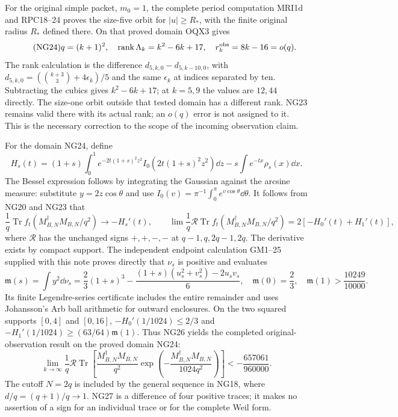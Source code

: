 \documentclass[11pt]{article}
\newcommand{\Tr}{\operatorname{Tr}}\newcommand{\rank}{\operatorname{rank}}
\begin{document}
For the original simple packet, $m_0=1$, the complete period computation
MRI1d and RPC18--24 proves the size-five orbit for $|u|\ge R_*$,
with the finite original radius $R_*$ defined there. On that proved
domain OQX3 gives
\begin{equation}\tag{NG24}
 q=(k+1)^2,\quad \rank\Lambda_k=k^2-6k+17,
 \quad r_k^{\rm obs}=8k-16=o(q).
\end{equation}
The rank calculation is the difference
$d_{5,k,0}-d_{5,k-10,0}$, with
$d_{5,k,0}=(\binom{k+3}{3}+4\epsilon_k)/5$ and the same
$\epsilon_k$ at indices separated by ten. Subtracting the cubics
gives $k^2-6k+17$; at $k=5,9$ the values are $12,44$ directly.
The size-one orbit outside that tested domain has a different rank.
NG23 remains valid there with its actual rank; an $o(q)$ error is not
assigned to it. This is the necessary correction to the scope of the
incoming observation claim.

For the domain NG24, define
\begin{equation}\tag{NG25}
 H_s(t)=(1+s)\int_0^1 e^{-2t(1+s)^2z^2}
                    I_0(2t(1+s)^2z^2)\dd z
                      -s\int e^{-tx}\rho_s(x)\dd x.
\end{equation}
The Bessel expression follows by integrating the Gaussian against the
arcsine measure: substitute $y=2z\cos\theta$ and use
$I_0(v)=\pi^{-1}\int_0^\pi e^{v\cos\theta}\dd\theta$.
It follows from NG20 and NG23 that
\begin{equation}\tag{NG26}
 \frac1q\Tr f_t(M_{B,N}^{\dagger}M_{B,N}/q^2)\longrightarrow-H_s'(t),
 \qquad
 \lim\frac1q\mathcal R\Tr f_t(M_{B,N}^{\dagger}M_{B,N}/q^2)
                       =2[-H_0'(t)+H_1'(t)],
\end{equation}
where $\mathcal R$ has the unchanged signs $+,+,-,-$ at
$q-1,q,2q-1,2q$. The derivative exists by compact support.
The independent endpoint calculation GM1--25 supplied with this note
proves directly that $\nu_s$ is positive and evaluates
\[
 \mathfrak m(s)=\int y^2\dd\nu_s
 =\frac23(1+s)^3-\frac{(1+s)(u_s^2+v_s^2)-2u_sv_s}{6},
 \quad \mathfrak m(0)=\frac23,\quad \mathfrak m(1)>\frac{10249}{10000}.
\]
Its finite Legendre-series certificate includes the entire remainder and
uses Johansson's Arb ball arithmetic \cite{arb} for outward enclosures.
On the two squared supports $[0,4]$ and $[0,16]$,
$-H_0'(1/1024)\le2/3$ and
$-H_1'(1/1024)\ge(63/64)\mathfrak m(1)$. Thus NG26 yields the
completed original-observation result on the proved domain NG24:
\begin{equation}\tag{NG27}
 \boxed{\displaystyle
 \lim_{k\to\infty}\frac1q\mathcal R\Tr\left[
 \frac{M_{B,N}^{\dagger}M_{B,N}}{q^2}
 \exp\!\left(-\frac{M_{B,N}^{\dagger}M_{B,N}}{1024q^2}\right)\right]
 <-\frac{657061}{960000}.}
\end{equation}
The cutoff $N=2q$ is included by the general sequence in NG18, where
$d/q=(q+1)/q\to1$. NG27 is a difference of four positive traces; it makes no
assertion of a sign for an individual trace or for the complete Weil form.
\end{document}
